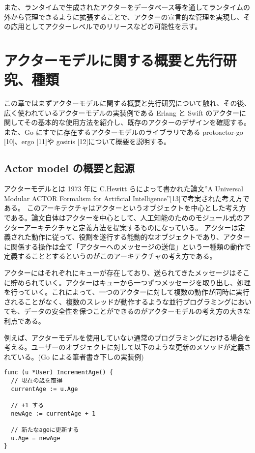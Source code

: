 また、ランタイムで生成されたアクターをデータベース等を通してランタイムの外から管理できるように拡張することで、アクターの宣言的な管理を実現し、その応用としてアクターレベルでのリリースなどの可能性を示す。

\section{アクターモデルに関する概要と先行研究、種類}

この章ではまずアクターモデルに関する概要と先行研究について触れ、その後、広く使われているアクターモデルの実装例である
Erlang と Swift
のアクターに関してその基本的な使用方法を紹介し、既存のアクターのデザインを確認する。また、Go
にすでに存在するアクターモデルのライブラリである protoactor-go
{[}10{]}、ergo {[}11{]}や gosiris {[}12{]}について概要を説明する。

\subsection{Actor model の概要と起源}

アクターモデルとは 1973 年に C.Hewitt らによって書かれた論文''A
Universal Modular ACTOR Formalism for Artificial
Intelligence''{[}13{]}で考案された考え方である。
このアーキテクチャはアクターというオブジェクトを中心とした考え方である。論文自体はアクターを中心として、人工知能のためのモジュール式のアクターアーキテクチャと定義方法を提案するものになっている。
アクターは定義された動作に従って、役割を遂行する能動的なオブジェクトであり、アクターに関係する操作は全て「アクターへのメッセージの送信」という一種類の動作で定義することとするというのがこのアーキテクチャの考え方である。

アクターにはそれぞれにキューが存在しており、送られてきたメッセージはそこに貯められていく。アクターはキューから一つずつメッセージを取り出し、処理を行っていく。これによって、一つのアクターに対して複数の動作が同時に実行されることがなく、複数のスレッドが動作するような並行プログラミングにおいても、データの安全性を保つことができるのがアクターモデルの考え方の大きな利点である。

例えば、アクターモデルを使用していない通常のプログラミングにおける場合を考える。ユーザーのオブジェクトに対して以下のような更新のメソッドが定義されている。(Go
による筆者書き下しの実装例)

\begin{verbatim}
func (u *User) IncrementAge() {
  // 現在の歳を取得
  currentAge := u.Age

  // +1 する
  newAge := currentAge + 1

  // 新たなageに更新する
  u.Age = newAge
}
\end{verbatim}

